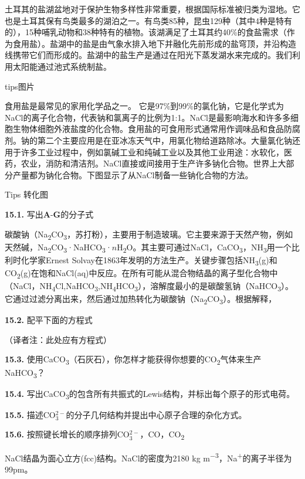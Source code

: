 土耳其的盐湖盆地对于保护生物多样性非常重要，根据国际标准被归类为湿地。它也是土耳其保有鸟类最多的湖泊之一。有鸟类85种，昆虫129种（其中4种是特有的），15种哺乳动物和38种特有的植物。该湖满足了土耳其约40\%的食盐需求（作为食用盐）。盐湖中的盐是由气象水排入地下并融化先前形成的盐穹顶，并沿构造线携带它们而形成的。盐湖中的盐生产是通过在阳光下蒸发湖水来完成的。我们利用太阳能通过池式系统制盐。

tips图片

食用盐是最常见的家用化学品之一。
它是97\%到99\%的氯化钠，它是化学式为NaCl的离子化合物，代表钠和氯离子的比例为1:1。NaCl是最影响海水和许多多细胞生物体细胞外液盐度的化合物。食用盐的可食用形式通常用作调味品和食品防腐剂。钠的第二个主要应用是在亚冰冻天气中，用氯化物给道路除冰。大量氯化钠还用于许多工业过程中，例如氯碱工业和纯碱工业以及其他工业用途：水软化，医药，农业，消防和清洁剂。NaCl直接或间接用于生产许多钠化合物。世界上大部分产量都为钠化合物。下图显示了从NaCl制备一些钠化合物的方法。

Tips 转化图

\noindent\textbf{15.1.} 写出\textbf{A}-\textbf{G}的分子式

碳酸钠（Na\textsubscript{2}CO\textsubscript{3}，苏打粉），主要用于制造玻璃。它主要来源于天然产物，例如天然碱，Na\textsubscript{2}CO\textsubscript{3}·NaHCO\textsubscript{3}·$n$H\textsubscript{2}O。其主要可通过NaCl，CaCO\textsubscript{3}，NH\textsubscript{3}用一个比利时化学家Ernest Solvay在1863年发明的方法生产。关键步骤包括NH\textsubscript{3}(g)和CO\textsubscript{2}(g)在饱和NaCl(aq)中反应。在所有可能从混合物结晶的离子型化合物中（NaCl，NH\textsubscript{4}Cl,NaHCO\textsubscript{3},NH\textsubscript{4}HCO\textsubscript{3}），溶解度最小的是碳酸氢钠（NaHCO\textsubscript{3}）。它通过过滤分离出来，然后通过加热转化为碳酸钠（Na\textsubscript{2}CO\textsubscript{3}）。根据解释，

\noindent\textbf{15.2.} 配平下面的方程式

（译者注：此处应有方程式）

\noindent\textbf{15.3.}
使用CaCO\textsubscript{3}（石灰石），你怎样才能获得你想要的CO\textsubscript{2}气体来生产NaHCO\textsubscript{3}？

\noindent\textbf{15.4.}
写出CaCO\textsubscript{3}的包含所有共振式的Lewis结构，并标出每个原子的形式电荷。

\noindent\textbf{15.5.}
描述CO$_3^{2-}$的分子几何结构并提出中心原子合理的杂化方式。

\noindent\textbf{15.6.}
按照键长增长的顺序排列CO$_3^{2-}$，CO，CO\textsubscript{2}

NaCl结晶为面心立方(fcc)结构。NaCl的密度为2180
kg m\textsuperscript{−3}，Na\textsuperscript{+}的离子半径为99pm。

